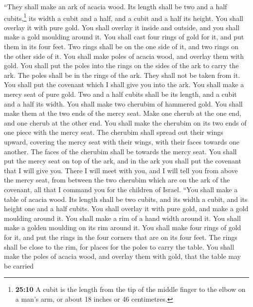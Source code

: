  ``They shall make an ark of acacia wood. Its length
shall be two and a half cubits,\footnote{\textbf{25:10} A cubit is the
  length from the tip of the middle finger to the elbow on a man's arm,
  or about 18 inches or 46 centimetres.} its width a cubit and a half,
and a cubit and a half its height.  You shall overlay it
with pure gold. You shall overlay it inside and outside, and you shall
make a gold moulding around it.  You shall cast four
rings of gold for it, and put them in its four feet. Two rings shall be
on the one side of it, and two rings on the other side of it.
 You shall make poles of acacia wood, and overlay them
with gold.  You shall put the poles into the rings on the
sides of the ark to carry the ark.  The poles shall be in
the rings of the ark. They shall not be taken from it. 
You shall put the covenant which I shall give you into the ark.
 You shall make a mercy seat of pure gold. Two and a half
cubits shall be its length, and a cubit and a half its width.
 You shall make two cherubim of hammered gold. You shall
make them at the two ends of the mercy seat.  Make one
cherub at the one end, and one cherub at the other end. You shall make
the cherubim on its two ends of one piece with the mercy seat.
 The cherubim shall spread out their wings upward,
covering the mercy seat with their wings, with their faces towards one
another. The faces of the cherubim shall be towards the mercy seat.
 You shall put the mercy seat on top of the ark, and in
the ark you shall put the covenant that I will give you. 
There I will meet with you, and I will tell you from above the mercy
seat, from between the two cherubim which are on the ark of the
covenant, all that I command you for the children of Israel.
 ``You shall make a table of acacia wood. Its length
shall be two cubits, and its width a cubit, and its height one and a
half cubits.  You shall overlay it with pure gold, and
make a gold moulding around it.  You shall make a rim of
a hand width around it. You shall make a golden moulding on its rim
around it.  You shall make four rings of gold for it, and
put the rings in the four corners that are on its four feet.
 The rings shall be close to the rim, for places for the
poles to carry the table.  You shall make the poles of
acacia wood, and overlay them with gold, that the table may be carried
